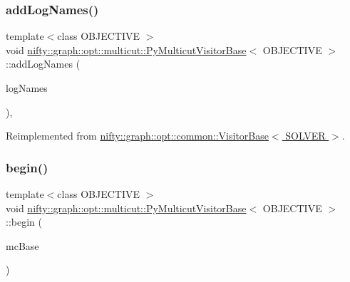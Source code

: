\subsubsection{\texorpdfstring{add\+Log\+Names()}{addLogNames()}\hspace{0.1cm}{\footnotesize\ttfamily [2/2]}}
{\footnotesize\ttfamily template$<$class O\+B\+J\+E\+C\+T\+I\+VE $>$ \\
void \hyperlink{classnifty_1_1graph_1_1opt_1_1multicut_1_1PyMulticutVisitorBase}{nifty\+::graph\+::opt\+::multicut\+::\+Py\+Multicut\+Visitor\+Base}$<$ O\+B\+J\+E\+C\+T\+I\+VE $>$\+::add\+Log\+Names (\begin{DoxyParamCaption}\item[{std\+::initializer\+\_\+list$<$ std\+::string $>$}]{log\+Names }\end{DoxyParamCaption})\hspace{0.3cm}{\ttfamily [inline]}, {\ttfamily [virtual]}}



Reimplemented from \hyperlink{classnifty_1_1graph_1_1opt_1_1common_1_1VisitorBase_acc4f1b419303965b0313ca83c6a7a420}{nifty\+::graph\+::opt\+::common\+::\+Visitor\+Base$<$ S\+O\+L\+V\+E\+R $>$}.

\mbox{\label{classnifty_1_1graph_1_1opt_1_1multicut_1_1PyMulticutVisitorBase_a4c31ac6a81426f9da50d75bd6af9fc06}} 
\subsubsection{\texorpdfstring{begin()}{begin()}\hspace{0.1cm}{\footnotesize\ttfamily [1/2]}}
{\footnotesize\ttfamily template$<$class O\+B\+J\+E\+C\+T\+I\+VE $>$ \\
void \hyperlink{classnifty_1_1graph_1_1opt_1_1multicut_1_1PyMulticutVisitorBase}{nifty\+::graph\+::opt\+::multicut\+::\+Py\+Multicut\+Visitor\+Base}$<$ O\+B\+J\+E\+C\+T\+I\+VE $>$\+::begin (\begin{DoxyParamCaption}\item[{\hyperlink{classnifty_1_1graph_1_1opt_1_1multicut_1_1PyMulticutVisitorBase_aa6d9f36fb629bf51dadbc1018595cb14}{Mc\+Base} $\ast$}]{mc\+Base }\end{DoxyParamCaption})\hspace{0.3cm}{\ttfamily [inline]}}

